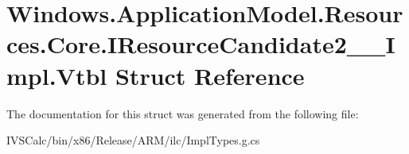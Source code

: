 \hypertarget{struct_windows_1_1_application_model_1_1_resources_1_1_core_1_1_i_resource_candidate2_____impl_1_1_vtbl}{}\section{Windows.\+Application\+Model.\+Resources.\+Core.\+I\+Resource\+Candidate2\+\_\+\+\_\+\+Impl.\+Vtbl Struct Reference}
\label{struct_windows_1_1_application_model_1_1_resources_1_1_core_1_1_i_resource_candidate2_____impl_1_1_vtbl}


The documentation for this struct was generated from the following file\+:\begin{DoxyCompactItemize}
\item 
I\+V\+S\+Calc/bin/x86/\+Release/\+A\+R\+M/ilc/Impl\+Types.\+g.\+cs\end{DoxyCompactItemize}
